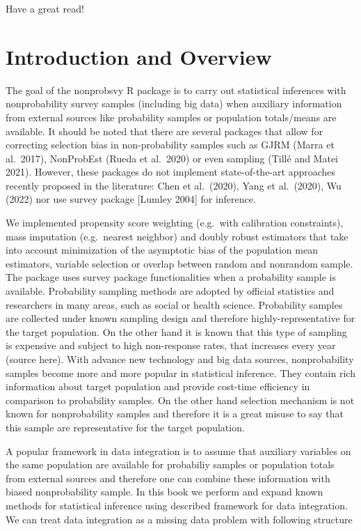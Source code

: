 \documentclass[
  letterpaper,
  DIV=11,
  numbers=noendperiod]{scrreprt}
\begin{document}
Have a great read!


\hypertarget{introduction-and-overview}{%
\chapter{Introduction and Overview}\label{introduction-and-overview}}

The goal of the nonprobsvy R package is to carry out statistical
inferences with nonprobability survey samples (including big data) when
auxiliary information from external sources like probability samples or
population totals/means are available. It should be noted that there are
several packages that allow for correcting selection bias in
non-probability samples such as GJRM (Marra et al.~2017), NonProbEst
(Rueda et al.~2020) or even sampling (Tillé and Matei 2021). However,
these packages do not implement state-of-the-art approaches recently
proposed in the literature: Chen et al.~(2020), Yang et al.~(2020), Wu
(2022) nor use survey package {[}Lumley 2004{]} for inference.

We implemented propensity score weighting (e.g.~with calibration
constraints), mass imputation (e.g.~nearest neighbor) and doubly robust
estimators that take into account minimization of the asymptotic bias of
the population mean estimators, variable selection or overlap between
random and nonrandom sample. The package uses survey package
functionalities when a probability sample is available. Probability
sampling methods are adopted by official statistics and researchers in
many areas, such as social or health science. Probability samples are
collected under known sampling design and therefore
highly-representative for the target population. On the other hand it is
known that this type of sampling is expensive and subject to high
non-response rates, that increases every year (source here). With
advance new technology and big data sources, nonprobability samples
become more and more popular in statistical inference. They contain rich
information about target population and provide cost-time efficiency in
comparison to probability samples. On the other hand selection mechanism
is not known for nonprobability samples and therefore it is a great
misuse to say that this sample are representative for the target
population.

A popular framework in data integration is to assume that auxiliary
variables on the same population are available for probabiliy samples or
population totals from external sources and therefore one can combine
these information with biased nonprobability sample. In this book we
perform and expand known methods for statistical inference using
described framework for data integration. We can treat data integration
as a missing data problem with following structure
\end{document}
